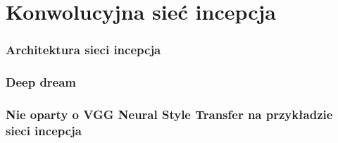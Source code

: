 \chapter{Konwolucyjna sieć incepcja}
\label{chap:inception}

\subsection{Architektura sieci incepcja}

\subsection{Deep dream}

\subsection{Nie oparty o VGG Neural Style Transfer na przykładzie sieci incepcja}
